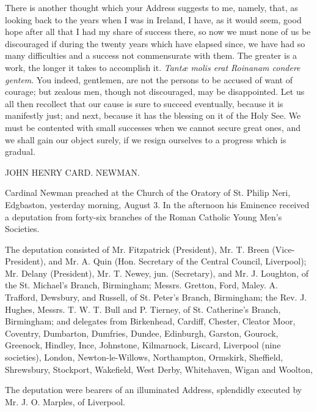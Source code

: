 There is another thought which your Address suggests to me, namely,
that, as looking back to the years when I was in Ireland, I have, as
it would seem, good hope after all that I had my share of success
there, so now we must none of us be discouraged if during the twenty
years which have elapsed since, we have had so many difficulties and a
success not commensurate with them. The greater is a work, the longer
it takes to accomplish it. \emph{Tantæ molis erat Roinanam condere
gentem}. You indeed, gentlemen, are not the persons to be accused
of want of courage; but zealous men, though not discouraged, may be
disappointed. Let us all then recollect that our cause is sure to
succeed eventually, because it is manifestly just; and next, because
it has the blessing on it of the Holy See. We must be contented with
small successes when we cannot secure great ones, and we shall gain
our object surely, if we resign ourselves to a progress which is
gradual.

JOHN HENRY CARD.
NEWMAN.


Cardinal Newman preached at the Church of the Oratory of St. Philip
Neri, Edgbaston, yesterday morning, August 3. In the afternoon his
Eminence received a deputation from forty-six branches of the Roman
Catholic Young Men's Societies.

The deputation consisted of Mr. Fitzpatrick (President), Mr. T.
Breen (Vice-President), and Mr. A. Quin (Hon. Secretary of the Central
Council, Liverpool); Mr. Delany (President), Mr. T. Newey, jun.
(Secretary), and Mr. J. Loughton, of the St. Michael's Branch,
Birmingham; Messrs. Gretton, Ford, Maley. A. Trafford, Dewsbury, and
Russell, of St. Peter's Branch, Birmingham; the Rev. J. Hughes,
Messrs. T. W. T. Bull and P. Tierney, of St. Catherine's Branch,
Birmingham; and delegates from Birkenhead, Cardiff, Chester, Cleator
Moor, Coventry, Dumbarton, Dumfries, Dundee, Edinburgh, Garston,
Gourock, Greenock, Hindley, Ince, Johnstone, Kilmarnock, Liscard,
Liverpool (nine societies), London, Newton-le-Willows, Northampton,
Ormskirk, Sheffield, Shrewsbury, Stockport, Wakefield, West Derby,
Whitehaven, Wigan and Woolton,

The deputation were bearers of an illuminated Address, splendidly
executed by Mr. J. O. Marples, of Liverpool.

